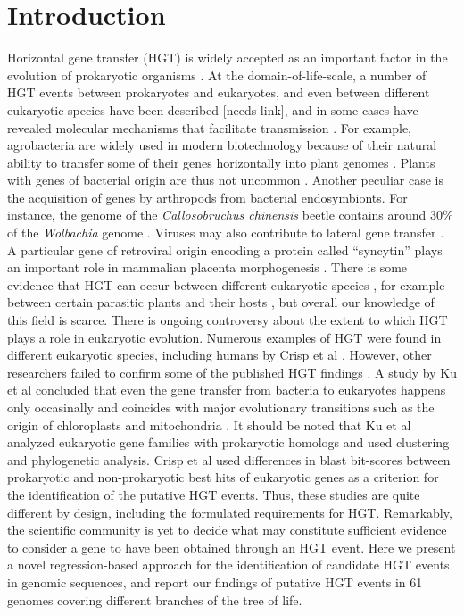 \section{Introduction}
\label{intro}
Horizontal gene transfer (HGT) is widely accepted as an important factor in the
evolution of prokaryotic organisms \cite{Ochman2000}. At the
domain-of-life-scale, a number of HGT events between prokaryotes and
eukaryotes, and even between different eukaryotic species have been described
[needs link], and in some cases have revealed molecular mechanisms that
facilitate transmission \cite{Soucy2015}. For example, agrobacteria are widely
used in modern biotechnology because of their natural ability to transfer some
of their genes horizontally into plant genomes \cite{Chilton1977}. Plants with
genes of bacterial origin are thus not uncommon \cite{Kyndt2015, Matveeva2012,
Matveeva2014}. Another peculiar case is the acquisition of genes by arthropods
from bacterial endosymbionts. For instance, the genome of the
\textit{Callosobruchus chinensis} beetle contains around 30\% of the
\textit{Wolbachia} genome \cite{Nikoh2008}. Viruses may also contribute to
lateral gene transfer \cite{Drezen2017}. A particular gene of retroviral origin
encoding a protein called ``syncytin'' plays an important role in mammalian
placenta morphogenesis \cite{Mi2000}. There is some evidence that HGT can occur
between different eukaryotic species \cite{Soucy2015}, for example between
certain parasitic plants and their hosts
\cite{Yoshida2010,Xi2012,Zhang2013,Zhang2014}, but overall our knowledge of
this field is scarce. There is ongoing controversy about the extent to which
HGT plays a role in eukaryotic evolution. Numerous examples of HGT were found
in different eukaryotic species, including humans by Crisp et al
\cite{Crisp2015}. However, other researchers failed to confirm some of the
published HGT findings \cite{Salzberg2017}. A study by Ku et al concluded that
even the gene transfer from bacteria to eukaryotes happens only occasinally and
coincides with major evolutionary transitions such as the origin of
chloroplasts and mitochondria \cite{Ku2015}. It should be noted that Ku et al
analyzed eukaryotic gene families with prokaryotic homologs and used clustering
and phylogenetic analysis. Crisp et al used differences in blast bit-scores
between prokaryotic and non-prokaryotic best hits of eukaryotic genes as a
criterion for the identification of the putative HGT events. Thus, these
studies are quite different by design, including the formulated requirements
for HGT. Remarkably, the scientific community is yet to decide what may
constitute sufficient evidence to consider a gene to have been obtained through
an HGT event. Here we present a novel regression-based approach for the
identification of candidate HGT events in genomic sequences, and report our
findings of putative HGT events in 61 genomes covering different branches of
the tree of life.
